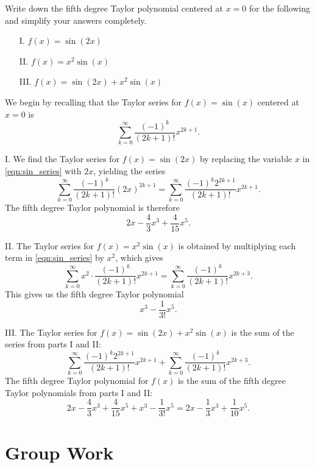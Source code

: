 \documentclass[noauthor]{ximera}
\begin{document}
\begin{problem} 
Write down the fifth degree Taylor polynomial centered at $x=0$ for the following and simplify your answers completely.  

\begin{itemize}
\item[I.]  $f(x) = \sin(2x)$
\item[II.] $f(x) = x^2 \sin(x)$
\item[III.] $f(x) = \sin(2x)+ x^2 \sin(x)$
\end{itemize}

\begin{freeResponse}
We begin by recalling that the Taylor series for $f(x)=\sin(x)$ centered at $x=0$ is 
\begin{equation}\label{eqn:sin_series}
\sum_{k=0}^\infty \frac{(-1)^k}{(2k+1)!} x^{2k+1}.
\end{equation}

I. We find the Taylor series for $f(x) = \sin(2x)$ by replacing the variable $x$ in \eqref{eqn:sin_series} with $2x$, yielding the series
$$
\sum_{k=0}^\infty \frac{(-1)^k}{(2k+1)!} (2x)^{2k+1} = \sum_{k=0}^\infty \frac{(-1)^k2^{2k+1}}{(2k+1)!} x^{2k+1}.
$$
The fifth degree Taylor polynomial is therefore
$$
2x - \frac{4}{3}x^3 + \frac{4}{15} x^5.
$$

II. The Taylor series for $f(x) = x^2 \sin(x)$ is obtained by multiplying each term in \eqref{eqn:sin_series} by $x^2$, which gives
$$
\sum_{k=0}^\infty x^2 \cdot \frac{(-1)^k}{(2k+1)!} x^{2k+1} = \sum_{k=0}^\infty \frac{(-1)^k}{(2k+1)!} x^{2k+3}.
$$
This gives us the fifth degree Taylor polynomial
$$
x^3 - \frac{1}{3!} x^5.
$$

III. The Taylor series for $f(x) = \sin(2x)+ x^2 \sin(x)$ is the sum of the series from parts I and II:
$$
\sum_{k=0}^\infty \frac{(-1)^k 2^{2k+1}}{(2k+1)!} x^{2k+1} + \sum_{k=0}^\infty \frac{(-1)^k}{(2k+1)!} x^{2k+3}.
$$
The fifth degree Taylor polynomial for $f(x)$ is the sum of the fifth degree Taylor polynomials from parts I and II:
$$
2x - \frac{4}{3}x^3 + \frac{4}{15} x^5 + x^3 - \frac{1}{3!} x^5 = 2x - \frac{1}{3} x^3 + \frac{1}{10} x^5.
$$

\end{freeResponse}
\end{problem}


\section{Group Work}
\end{document}
